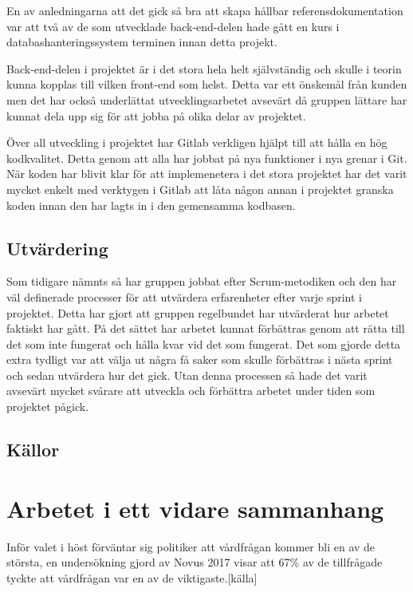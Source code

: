 En av anledningarna att det gick så bra att skapa hållbar referensdokumentation var att två av de som utvecklade back-end-delen hade gått en kurs i databashanteringssystem terminen innan detta projekt.

Back-end-delen i projektet är i det stora hela helt självständig och skulle i teorin kunna kopplas till vilken front-end som helst. Detta var ett önskemål från kunden men det har också underlättat utvecklingsarbetet avsevärt då gruppen lättare har kunnat dela upp sig för att jobba på olika delar av projektet.

Över all utveckling i projektet har Gitlab verkligen hjälpt till att hålla en hög kodkvalitet. Detta genom att alla har jobbat på nya funktioner i nya grenar i Git. När koden har blivit klar för att implemenetera i det stora projektet har det varit mycket enkelt med verktygen i Gitlab att låta någon annan i projektet granska koden innan den har lagts in i den gemensamma kodbasen.

\subsection{Utvärdering}
Som tidigare nämnts så har gruppen jobbat efter Scrum-metodiken och den har väl definerade processer för att utvärdera erfarenheter efter varje sprint i projektet. Detta har gjort att gruppen regelbundet har utvärderat hur arbetet faktiskt har gått. På det sättet har arbetet kunnat förbättras genom att rätta till det som inte fungerat och hålla kvar vid det som fungerat. Det som gjorde detta extra tydligt var att välja ut några få saker som skulle förbättras i nästa sprint och sedan utvärdera hur det gick. Utan denna processen så hade det varit avsevärt mycket svårare att utveckla och förbättra arbetet under tiden som projektet pågick.

\subsection{Källor}


\section{Arbetet i ett vidare sammanhang}

Inför valet i höst förväntar sig politiker att vårdfrågan kommer bli en av de största, en undersökning gjord av Novus 2017 visar att 67\% av de tillfrågade tyckte att vårdfrågan var en av de viktigaste.[källa]

